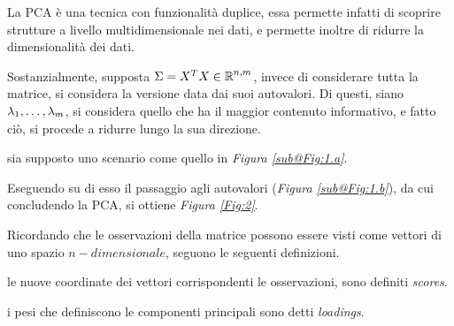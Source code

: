 \documentclass{subfiles}
\begin{document}
La PCA è una tecnica con funzionalità duplice, essa permette infatti di scoprire strutture a livello multidimensionale nei dati,
e permette inoltre di ridurre la dimensionalità dei dati.

Sostanzialmente, supposta $\Sigma = X^{T}X \in \operatorname{\mathbb{R}}^{n, m}$, invece di considerare tutta la matrice,
si considera la versione data dai suoi autovalori. Di questi, siano ${\lambda}_{1}, \ldots, {\lambda}_{m}$, si considera quello che ha il maggior contenuto informativo,
e fatto ciò, si procede a ridurre lungo la sua direzione.

\begin{Example*}
    sia supposto uno scenario come quello in \emph{Figura \ref{sub@Fig:1.a}}.
    
    Eseguendo su di esso il passaggio agli autovalori (\emph{Figura \ref{sub@Fig:1.b}}),
    da cui concludendo la PCA, si ottiene \emph{Figura \ref{Fig:2}}.
    
\end{Example*}

Ricordando che le osservazioni della matrice possono essere visti come vettori di uno spazio $n-dimensionale$, seguono le seguenti definizioni.
\begin{Definition*}
    le nuove coordinate dei vettori corrispondenti le osservazioni, sono definiti \emph{scores}.
\end{Definition*}
\begin{Definition*}
    i pesi che definiscono le componenti principali sono detti \emph{loadings}.
\end{Definition*}
\end{document}
